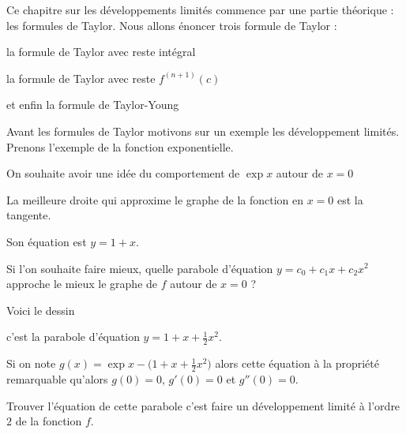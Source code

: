 







\debuttexte

\diapo

\change

Ce chapitre sur les développements limités commence par une partie théorique : les formules de Taylor.
Nous allons énoncer trois formule de Taylor :

\change

la formule de Taylor avec reste intégral

\change

la formule de Taylor avec reste $f^{(n+1)}(c)$

\change
   
et enfin la formule de Taylor-Young


\diapo

Avant les formules de Taylor motivons sur un exemple les développement limités.
Prenons l'exemple de la fonction exponentielle.

On souhaite avoir une idée du comportement de $\exp x$ autour de $x=0$ 


\change

La meilleure droite qui approxime le graphe de la fonction en $x=0$
est la tangente.

\change

Son équation  est $y=1+x$.

\change

Si l'on souhaite faire mieux, quelle parabole d'équation $y = c_0 + c_1x + c_2 x^2$ approche le mieux 
le graphe de $f$ autour de $x=0$ ? 

\change


Voici le dessin

\change


c'est la parabole d'équation $y=1+x+\frac12 x^2$. 


\change

Si on note $g(x)=\exp x - \big(1+x+\frac12 x^2\big)$ alors
cette équation à la propriété remarquable qu'alors
$g(0)=0$, $g'(0)=0$ et $g''(0)=0$. 


\change

Trouver l'équation de cette parabole c'est faire un développement limité à l'ordre $2$
de la fonction $f$.

